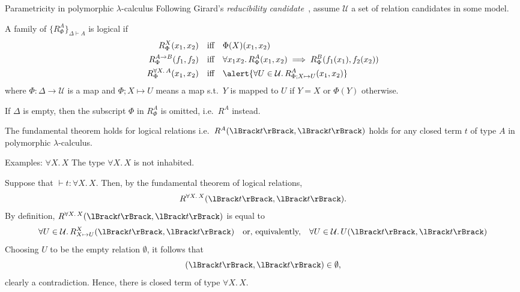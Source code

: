 \begin{frame}{Parametricity in polymorphic $\lambda$-calculus}
  Following Girard's \emph{reducibility candidate}~\cite{Girard1989}, assume $\mathcal{U}$ a set of \alert{relation candidates} in some model.

  A family of $\{ R_{\Phi}^{A} \}_{\Delta \vdash A}$ is logical if
  \begin{align*}
    R^{X}_{\Phi}(x_1, x_2)        & \quad\text{iff} \quad\Phi(X)(x_1, x_2)  \\
    R^{A \to B}_{\Phi}(f_1, f_2)  & \quad \text{iff} \quad \forall x_1 x_2.\, R^{A}_{\Phi}(x_1, x_2) \implies R^{B}_{\Phi}(f_1(x_1), f_2(x_2)) \\
    R^{\forall X.\, A}_{\Phi}(x_1, x_2) & \quad\text{iff}\quad \alert{\forall U \in \mathcal{U}.\, R^{A}_{\Phi; X \mapsto U}(x_1, x_2)}
  \end{align*}
  where $\Phi\colon \Delta \to \mathcal{U}$ is a map and $\Phi; X \mapsto U$ means a map s.t.\ $Y$ is mapped to $U$ if $Y = X$ or $\Phi(Y)$ otherwise.

  If $\Delta$ is empty, then the subscript $\Phi$ in $R^A_{\Phi}$ is omitted, i.e.\ $R^A$ instead.
  \begin{theorem}
    The fundamental theorem holds for logical relations i.e.\ $R^A(\Brackets{t}, \Brackets{t})$ holds for any closed term $t$ of type $A$ in polymorphic $\lambda$-calculus. 
  \end{theorem}
  
\end{frame}

\begin{frame}{Examples: $\forall X.\, X$}
  The type $\forall X.\, X$ is not inhabited.

  Suppose that $\vdash t : \forall X.\, X$.
  Then, by the fundamental theorem of logical relations,
  \[
    R^{\forall X.\, X}(\Brackets{t}, \Brackets{t}).
  \]
  By definition, $R^{\forall X.\, X}(\Brackets{t}, \Brackets{t})$ is equal to
  \[
    \forall U \in \mathcal{U}.\, R^X_{X \mapsto U}(\Brackets{t}, \Brackets{t})
    \quad\text{or, equivalently,}\quad
    \forall U \in \mathcal{U}.\, U(\Brackets{t}, \Brackets{t})
  \]
  Choosing $U$ to be the empty relation $\emptyset$, it follows that
  \[
    (\Brackets{t}, \Brackets{t}) \in \emptyset,
  \]
  clearly a contradiction.
  Hence, there is closed term of type $\forall X.\, X$.
\end{frame}

